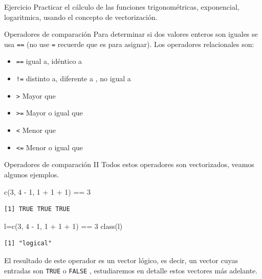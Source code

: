\documentclass[
  ignorenonframetext,
  aspectratio=169,
  spanish,
]{beamer}
\newenvironment{Shaded}{\begin{snugshade}}{\end{snugshade}}
\newcommand{\DecValTok}[1]{\textcolor[rgb]{0.68,0.00,0.00}{#1}}
\newcommand{\FunctionTok}[1]{\textcolor[rgb]{0.28,0.35,0.67}{#1}}
\newcommand{\NormalTok}[1]{\textcolor[rgb]{0.00,0.23,0.31}{#1}}
\newcommand{\OtherTok}[1]{\textcolor[rgb]{0.00,0.23,0.31}{#1}}
\newcommand{\SpecialCharTok}[1]{\textcolor[rgb]{0.37,0.37,0.37}{#1}}
\providecommand{\tightlist}{%
  \setlength{\itemsep}{0pt}\setlength{\parskip}{0pt}}
\begin{document}
\begin{frame}{Ejercicio}
\label{ejercicio}
Practicar el cálculo de las funciones trigonométricas, exponencial,
logaritmica, usando el concepto de vectorización.
\end{frame}

\begin{frame}[fragile]{Operadores de comparación}
\label{operadores-de-comparaciuxf3n}
Para determinar si dos valores enteros son iguales se usa \texttt{==}
(no use \texttt{=} recuerde que es para asignar). Los operadores
relacionales son:

\begin{itemize}
\tightlist
\item
  \texttt{==} igual a, idéntico a
\item
  \texttt{!=} distinto a, diferente a , no igual a
\item
  \texttt{\textgreater{}} Mayor que
\item
  \texttt{\textgreater{}=} Mayor o igual que
\item
  \texttt{\textless{}} Menor que
\item
  \texttt{\textless{}=} Menor o igual que
\end{itemize}
\end{frame}

\begin{frame}[fragile]{Operadores de comparación II}
\label{operadores-de-comparaciuxf3n-ii}
Todos estos operadores son vectorizados, veamos algunos ejemplos.

\begin{Shaded}
\begin{Highlighting}[]
\FunctionTok{c}\NormalTok{(}\DecValTok{3}\NormalTok{, }\DecValTok{4} \SpecialCharTok{{-}} \DecValTok{1}\NormalTok{, }\DecValTok{1} \SpecialCharTok{+} \DecValTok{1} \SpecialCharTok{+} \DecValTok{1}\NormalTok{) }\SpecialCharTok{==} \DecValTok{3} 
\end{Highlighting}
\end{Shaded}

\begin{verbatim}
[1] TRUE TRUE TRUE
\end{verbatim}

\begin{Shaded}
\begin{Highlighting}[]
\NormalTok{l}\OtherTok{=}\FunctionTok{c}\NormalTok{(}\DecValTok{3}\NormalTok{, }\DecValTok{4} \SpecialCharTok{{-}} \DecValTok{1}\NormalTok{, }\DecValTok{1} \SpecialCharTok{+} \DecValTok{1} \SpecialCharTok{+} \DecValTok{1}\NormalTok{) }\SpecialCharTok{==} \DecValTok{3} 
\FunctionTok{class}\NormalTok{(l)}
\end{Highlighting}
\end{Shaded}

\begin{verbatim}
[1] "logical"
\end{verbatim}

El resultado de este operador es un vector lógico, es decir, un vector
cuyas entradas son \texttt{TRUE} o \texttt{FALSE} , estudiaremos en
detalle estos vectores más adelante.
\end{frame}
\end{document}
